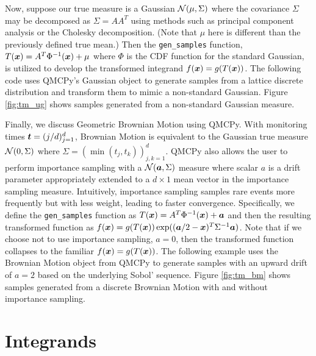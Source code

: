 \documentclass[graybox,footinfo]{svmult}
\begin{document}
Now, suppose our true measure is a Gaussian ${\mathcal{N}}(\mu,\Sigma)$ where the covariance $\Sigma$ may be decomposed as $\Sigma=AA^T$ using methods such as principal component analysis or the Cholesky decomposition. (Note that $\mu$ here is different than the previously defined true mean.) Then the \texttt{gen\_samples} function, $T({\boldsymbol{x}}) = A^T \Phi^{-1}({\boldsymbol{x}}) + \mu$ where $\Phi$ is the CDF function for the standard Gaussian, is utilized to develop the transformed integrand $f({\boldsymbol{x}}) = g(T({\boldsymbol{x}}))$. The following code uses QMCPy's Gaussian object to generate samples from a lattice discrete distribution and transform them to mimic a non-standard Gaussian. Figure \ref{fig:tm_ug} shows samples generated from a non-standard Gaussian measure.   




Finally, we discuss Geometric Brownian Motion using QMCPy. With monitoring times ${\boldsymbol{t}} = (j/d)_{j=1}^d$, Brownian Motion is equivalent to the Gaussian true measure ${\mathcal{N}}(0,\Sigma)$ where $\Sigma = (\min(t_j,t_k))_{j,k=1}^d$. QMCPy also allows the user to perform importance sampling with a ${\mathcal{N}}({\boldsymbol{a}},\Sigma)$ measure where scalar $a$ is a drift parameter appropriately extended to a $d \times 1$ mean vector in the importance sampling measure. Intuitively, importance sampling samples rare events more frequently but with less weight, leading to faster convergence. Specifically, we define the \texttt{gen\_samples} function as $T({\boldsymbol{x}}) = A^T\Phi^{-1}({\boldsymbol{x}}) + {\boldsymbol{a}}$ and then the resulting transformed function as $f({\boldsymbol{x}}) = g(T({\boldsymbol{x}}))\exp(({\boldsymbol{a}}/2-{\boldsymbol{x}})^T\Sigma^{-1}{\boldsymbol{a}})$. Note that if we choose not to use importance sampling, $a=0$, then the transformed function collapses to the familiar $f({\boldsymbol{x}}) = g(T({\boldsymbol{x}}))$. The following example uses the Brownian Motion object from QMCPy to generate samples with an upward drift of $a=2$ based on the underlying Sobol' sequence. Figure \ref{fig:tm_bm} shows samples generated from a discrete Brownian Motion with and without importance sampling. 



\fi

\section{Integrands}
\end{document}
